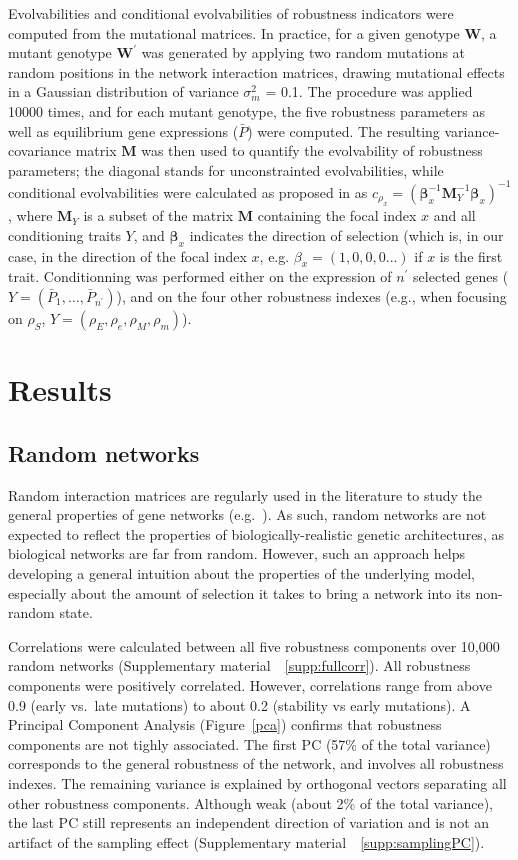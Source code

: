 \documentclass[a4paper]{article}
\newcommand{\stability}{{\rho_S}}
\newcommand{\earlyenv}{{\rho_E}}
\newcommand{\lateenv}{{\rho_e}}
\newcommand{\earlymut}{{\rho_M}}
\newcommand{\latemut}{{\rho_m}}
\newcommand{\SupMat}{Supplementary material~}
\begin{document}
Evolvabilities and conditional evolvabilities of robustness indicators were computed from the mutational matrices. In practice, for a given genotype $\bm W$, a mutant genotype $\bm W^\prime$ was generated by applying two random mutations at random positions in the network interaction matrices, drawing mutational effects in a Gaussian distribution of variance $\sigma_m^2$ = 0.1. The procedure was applied 10000 times, and for each mutant genotype, the five robustness parameters as well as equilibrium gene expressions ($\bar P$) were computed. The resulting variance-covariance matrix $\bm M$ was then used to quantify the evolvability of robustness parameters; the diagonal stands for unconstrainted evolvabilities, while conditional evolvabilities were calculated as proposed in \citet{HH08} as $c_{\rho_x} = (\bm \beta_x^{-1} \bm M_Y^{-1} \bm \beta_x)^{-1}$, where $\bm M_Y$ is a subset of the matrix $\bm M$ containing the focal index $x$ and all conditioning traits $Y$, and $\bm \beta_x$ indicates the direction of selection (which is, in our case, in the direction of the focal index $x$, e.g. $\beta_x = (1,0,0,0...)$ if $x$ is the first trait. Conditionning was performed either on the expression of $n^\prime$ selected genes ($Y = (\bar P_1, \dots, \bar P_{n^\prime})$), and on the four other robustness indexes (e.g., when focusing on $\stability$, $Y = (\earlyenv, \lateenv, \earlymut, \latemut)$). 

\section{Results}

\subsection{Random networks}

Random interaction matrices are regularly used in the literature to study the general properties of gene networks (e.g.\ \cite{CTH11,PBF12}). As such, random networks are not expected to reflect the properties of biologically-realistic genetic architectures, as biological networks are far from random. However, such an approach helps developing a general intuition about the properties of the underlying model, especially about the amount of selection it takes to bring a network into its non-random state. 

Correlations were calculated between all five robustness components over 10,000 random networks (\SupMat~\ref{supp:fullcorr}). All robustness components were positively correlated. However, correlations range from above 0.9 (early vs.\ late mutations) to about 0.2 (stability vs early mutations). A Principal Component Analysis (Figure~\ref{pca}) confirms that robustness components are not tighly associated. The first PC (57\% of the total variance) corresponds to the general robustness of the network, and involves all robustness indexes. The remaining variance is explained by orthogonal vectors separating all other robustness components. Although weak (about 2\% of the total variance), the last PC still represents an independent direction of variation and is not an artifact of the sampling effect (\SupMat~\ref{supp:samplingPC}). 
\end{document}
